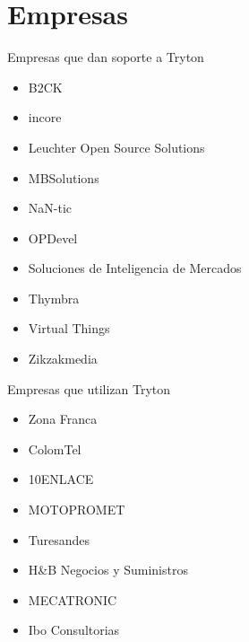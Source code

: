 
\section{Empresas}


	\begin{frame}{Empresas que dan soporte a Tryton}
		\begin{itemize}
			\item B2CK
			\item incore
			\item Leuchter Open Source Solutions
			\item MBSolutions
			\item NaN-tic
			\item OPDevel
			\item Soluciones de Inteligencia de Mercados
			\item Thymbra
			\item Virtual Things
			\item Zikzakmedia
		\end{itemize}
	\end{frame}



	\begin{frame}{Empresas que utilizan Tryton}
		\begin{itemize}
			\item Zona Franca
			\item ColomTel
			\item 10ENLACE
			\item MOTOPROMET
			\item Turesandes
			\item H\&B Negocios y Suministros
			\item MECATRONIC
			\item Ibo Consultorias
		\end{itemize}
	\end{frame}



